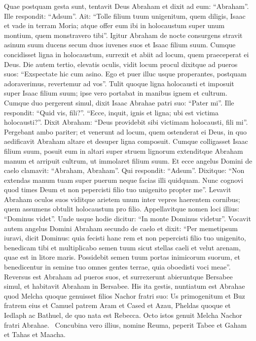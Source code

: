 \begin{biblechapter}  
\verse Quae postquam gesta sunt, tentavit Deus Abraham et dixit ad eum: “Abraham”. Ille respondit: “Adsum”. 
\verse Ait: “Tolle filium tuum unigenitum, quem diligis, Isaac et vade in terram Moria; atque offer eum ibi in holocaustum super unum montium, quem monstravero tibi”. 
\verse Igitur Abraham de nocte consurgens stravit asinum suum ducens secum duos iuvenes suos et Isaac filium suum. Cumque concidisset ligna in holocaustum, surrexit et abiit ad locum, quem praeceperat ei Deus. 
\verse Die autem tertio, elevatis oculis, vidit locum procul 
\verse dixitque ad pueros suos: “Exspectate hic cum asino. Ego et puer illuc usque properantes, postquam adoraverimus, revertemur ad vos”. 
\verse Tulit quoque ligna holocausti et imposuit super Isaac filium suum; ipse vero portabat in manibus ignem et cultrum. Cumque duo pergerent simul, 
\verse dixit Isaac Abrahae patri suo: “Pater mi”. Ille respondit: “Quid vis, fili?”. “Ecce, inquit, ignis et ligna; ubi est victima holocausti?”. 
\verse Dixit Abraham: “Deus providebit sibi victimam holocausti, fili mi”. Pergebant ambo pariter; 
\verse et venerunt ad locum, quem ostenderat ei Deus, in quo aedificavit Abraham altare et desuper ligna composuit. Cumque colligasset Isaac filium suum, posuit eum in altari super struem lignorum 
\verse extenditque Abraham manum et arripuit cultrum, ut immolaret filium suum. 
\verse Et ecce angelus Domini de caelo clamavit: “Abraham, Abraham”. Qui respondit: “Adsum”.  
\verse Dixitque: “Non extendas manum tuam super puerum neque facias illi quidquam. Nunc cognovi quod times Deum et non pepercisti filio tuo unigenito propter me”.  
\verse Levavit Abraham oculos suos viditque arietem unum inter vepres haerentem cornibus; quem assumens obtulit holocaustum pro filio. 
\verse Appellavitque nomen loci illius: “Dominus videt”. Unde usque hodie dicitur: “In monte Dominus videtur”. 
\verse Vocavit autem angelus Domini Abraham secundo de caelo et dixit: 
\verse “Per memetipsum iuravi, dicit Dominus: quia fecisti hanc rem et non pepercisti filio tuo unigenito, 
\verse benedicam tibi et multiplicabo semen tuum sicut stellas caeli et velut arenam, quae est in litore maris. Possidebit semen tuum portas inimicorum suorum, 
\verse et benedicentur in semine tuo omnes gentes terrae, quia oboedisti voci meae”. 
\verse Reversus est Abraham ad pueros suos, et surrexerunt abieruntque Bersabee simul, et habitavit Abraham in Bersabee. 
\verse His ita gestis, nuntiatum est Abrahae quod Melcha quoque genuisset filios Nachor fratri suo: 
\verse Us primogenitum et Buz fratrem eius et Camuel patrem Aram 
\verse et Cased et Azau, Pheldas quoque et Iedlaph 
\verse ac Bathuel, de quo nata est Rebecca. Octo istos genuit Melcha Nachor fratri Abrahae.  
\verse Concubina vero illius, nomine Reuma, peperit Tabee et Gaham et Tahas et Maacha. 
\end{biblechapter}

